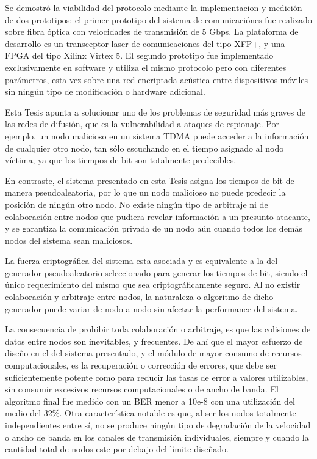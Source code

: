 
Se demostró la viabilidad del protocolo mediante la implementacion y medición de dos prototipos: el primer prototipo del sistema de comunicaciónes fue realizado sobre fibra óptica con velocidades de transmisión de 5 Gbps. La plataforma de desarrollo es un transceptor laser de comunicaciones del tipo XFP+, y una FPGA del tipo Xilinx Virtex 5.
El segundo prototipo fue implementado exclusivamente en software y utiliza el mismo protocolo pero con diferentes parámetros, esta vez sobre una red encriptada acústica entre dispositivos móviles sin ningún tipo de modificación o hardware adicional.

Esta Tesis apunta a solucionar uno de los problemas de seguridad más graves de las redes de difusión, que es la vulnerabilidad a ataques de espionaje. Por ejemplo, un nodo malicioso en un sistema TDMA puede acceder a la información de cualquier otro nodo, tan sólo escuchando en el tiempo asignado al nodo víctima, ya que los tiempos de bit son totalmente predecibles.  

En contraste, el sistema presentado en esta Tesis asigna los tiempos de bit de manera pseudoaleatoria, por lo que un nodo malicioso no puede predecir la posición de ningún otro nodo. No existe ningún tipo de arbitraje ni de colaboración entre nodos que pudiera revelar información a un presunto atacante, y se garantiza la comunicación privada de un nodo aún cuando todos los demás nodos del sistema sean maliciosos.

La fuerza criptográfica del sistema esta asociada y es equivalente a la del generador pseudoaleatorio seleccionado para generar los tiempos de bit, siendo el único requerimiento del mismo que sea criptográficamente seguro. Al no existir colaboración y arbitraje entre nodos, la naturaleza o algoritmo de dicho generador puede variar de nodo a nodo sin afectar la performance del sistema. 

La consecuencia de prohibir toda colaboración o arbitraje, es que las colisiones de datos entre nodos son inevitables, y frecuentes. De ahí que el mayor esfuerzo de diseño en el del sistema presentado, y el módulo de mayor consumo de recursos computacionales, es la recuperación o corrección de errores, que debe ser suficientemente potente como para reducir las tasas de error a valores utilizables, sin consumir excesivos recursos computacionales o de ancho de banda. El algoritmo final fue medido con un BER menor a 10e-8 con una utilización del medio del 32\%. Otra característica notable es que, al ser los nodos totalmente independientes entre sí, no se produce ningún tipo de degradación de la velocidad o ancho de banda en los canales de transmisión individuales, siempre y cuando la cantidad total de nodos este por debajo del límite diseñado.

